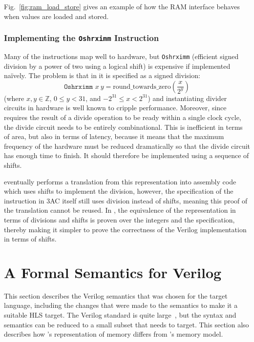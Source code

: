 Fig.~\ref{fig:ram_load_store} gives an example of how the RAM interface behaves when values are loaded and stored.

\subsubsection{Implementing the \texttt{Oshrximm} Instruction}\label{sec:algorithm:optimisation:oshrximm}


Many of the \compcert{} instructions map well to hardware, but \texttt{Oshrximm} (efficient signed division by a power of two using a logical shift) is expensive if implemented na\"ively. The problem is that in \compcert{} it is specified as a signed division:
\begin{equation*}
  \texttt{Oshrximm } x\ y = \text{round\_towards\_zero}\left(\frac{x}{2^{y}}\right)
\end{equation*}
(where $x, y \in \mathbb{Z}$, $0 \leq y < 31$, and $-2^{31} \leq x < 2^{31}$) and instantiating divider circuits in hardware is well known to cripple performance. Moreover, since \vericert{} requires the result of a divide operation to be ready within a single clock cycle, the divide circuit needs to be entirely combinational. This is inefficient in terms of area, but also in terms of latency, because it means that the maximum frequency of the hardware must be reduced dramatically so that the divide circuit has enough time to finish.  It should therefore be implemented using a sequence of shifts.

\compcert{} eventually performs a translation from this representation into
assembly code which uses shifts to implement the division, however, the
specification of the instruction in 3AC itself still uses division instead of
shifts, meaning this proof of the translation cannot be reused.  In \vericert{},
the equivalence of the representation in terms of divisions and shifts is proven
over the integers and the specification, thereby making it simpler to prove the
correctness of the Verilog implementation in terms of shifts.

\section{A Formal Semantics for Verilog}\label{sec:verilog}

\newcommand{\alwaysblock}{always-block}

This section describes the Verilog semantics that was chosen for the target language, including the changes that were made to the semantics to make it a suitable HLS target.  The Verilog standard is quite large~\cite{06_ieee_stand_veril_hardw_descr_languag,05_ieee_stand_veril_regis_trans_level_synth}, but the syntax and semantics can be reduced to a small subset that \vericert{} needs to target.  This section  also describes how \vericert{}'s representation of memory differs from \compcert{}'s memory model.

